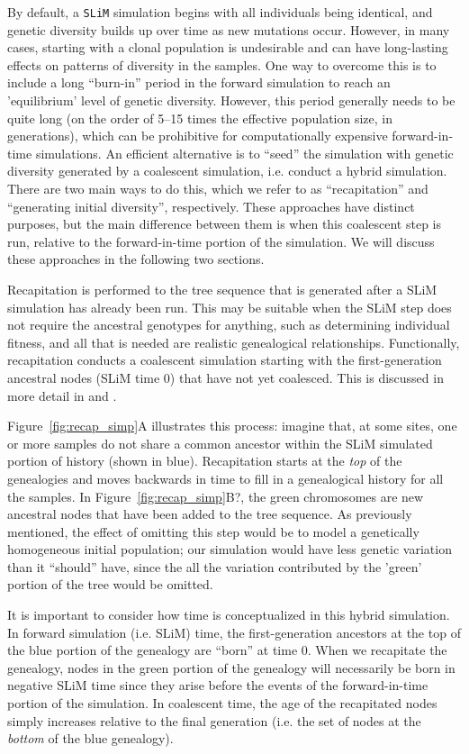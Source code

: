 \documentclass[12pt]{article}
\newcommand{\slim}[0]{\texttt{SLiM}\xspace}
\begin{document}
By default, a \slim simulation begins with all individuals being identical, and genetic diversity
builds up over time as new mutations occur. However, in many cases, starting with a clonal population
is undesirable and can have long-lasting effects on patterns of diversity in the samples. One way to overcome
this is to include a long ``burn-in'' period in the forward simulation to reach an 'equilibrium' level of genetic diversity.
However, this period generally needs to be quite long (on the order of 5--15 times the effective population size, in generations),
which can be prohibitive for computationally expensive forward-in-time simulations.
An efficient alternative is to ``seed'' the simulation with genetic diversity generated by a coalescent simulation, i.e. conduct a hybrid simulation.
There are two main ways to do this, which we refer to as ``recapitation'' and ``generating initial diversity'', respectively.
These approaches have distinct purposes, but the main difference between them is when
this coalescent step is run, relative to the forward-in-time portion of the simulation. We will discuss these approaches in the following two sections.

Recapitation is performed to the tree sequence that is generated after a SLiM simulation has already been run.
This may be suitable when the SLiM step does not require the ancestral genotypes for anything, such as determining individual fitness,
and all that is needed are realistic genealogical relationships. Functionally, recapitation conducts a coalescent simulation
starting with the first-generation ancestral nodes (SLiM time 0) that have not yet coalesced.
This is discussed in more detail in \citet{kelleher} and \citet{slim_manual}.

Figure~\ref{fig:recap_simp}A illustrates this process: imagine that, at some sites, one or more samples do not share
a common ancestor within the SLiM simulated portion of history (shown in blue).
Recapitation starts at the \textit{top} of the genealogies and moves backwards in time
to fill in a genealogical history for all the samples.
In Figure~\ref{fig:recap_simp}B?, the green chromosomes are new ancestral nodes that have been added to the tree sequence.
As previously mentioned, the effect of omitting this step would be to model a genetically homogeneous initial population;
our simulation would have less genetic variation than it ``should'' have, since the all the variation
contributed by the 'green' portion of the tree would be omitted.

It is important to consider how time is conceptualized in this hybrid simulation. In forward simulation (i.e. SLiM) time,
the first-generation ancestors at the top of the blue portion of the genealogy are ``born'' at time 0. When we recapitate the genealogy,
nodes in the green portion of the genealogy will necessarily be born in negative SLiM time since they arise before the events of the
forward-in-time portion of the simulation. In coalescent time, the age of the recapitated nodes simply increases relative to the final generation
(i.e. the set of nodes at the \textit{bottom} of the blue genealogy). %
\end{document}
